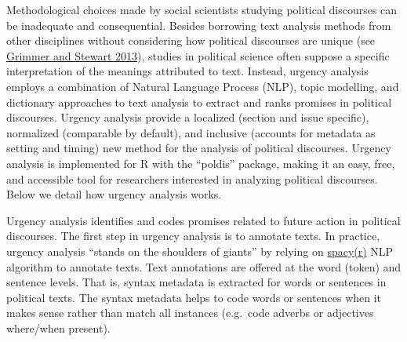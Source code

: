 \documentclass[
]{article}
\newenvironment{Shaded}{\begin{snugshade}}{\end{snugshade}}
\newcommand{\AttributeTok}[1]{\textcolor[rgb]{0.13,0.29,0.53}{#1}}
\newcommand{\FunctionTok}[1]{\textcolor[rgb]{0.13,0.29,0.53}{\textbf{#1}}}
\newcommand{\NormalTok}[1]{#1}
\newcommand{\OtherTok}[1]{\textcolor[rgb]{0.56,0.35,0.01}{#1}}
\newcommand{\SpecialCharTok}[1]{\textcolor[rgb]{0.81,0.36,0.00}{\textbf{#1}}}
\newcommand{\StringTok}[1]{\textcolor[rgb]{0.31,0.60,0.02}{#1}}
\begin{document}
Methodological choices made by social scientists studying political
discourses can be inadequate and consequential. Besides borrowing text
analysis methods from other disciplines without considering how
political discourses are unique (see
\href{https://www.cambridge.org/core/services/aop-cambridge-core/content/view/F7AAC8B2909441603FEB25C156448F20/S1047198700013401a.pdf/div-class-title-text-as-data-the-promise-and-pitfalls-of-automatic-content-analysis-methods-for-political-texts-div.pdf}{Grimmer
and Stewart 2013}), studies in political science often suppose a
specific interpretation of the meanings attributed to text. Instead,
urgency analysis employs a combination of Natural Language Process
(NLP), topic modelling, and dictionary approaches to text analysis to
extract and ranks promises in political discourses. Urgency analysis
provide a localized (section and issue specific), normalized (comparable
by default), and inclusive (accounts for metadata as setting and timing)
new method for the analysis of political discourses. Urgency analysis is
implemented for R with the ``poldis'' package, making it an easy, free,
and accessible tool for researchers interested in analyzing political
discourses. Below we detail how urgency analysis works.

Urgency analysis identifies and codes promises related to future action
in political discourses. The first step in urgency analysis is to
annotate texts. In practice, urgency analysis ``stands on the shoulders
of giants'' by relying on
\href{https://spacy.io/universe/project/spacyr}{spacy(r)} NLP algorithm
to annotate texts. Text annotations are offered at the word (token) and
sentence levels. That is, syntax metadata is extracted for words or
sentences in political texts. The syntax metadata helps to code words or
sentences when it makes sense rather than match all instances (e.g.~code
adverbs or adjectives where/when present).

\begin{Shaded}
\end{Shaded}
\end{document}
